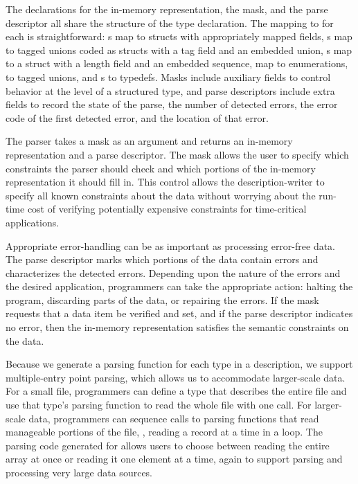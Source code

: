 The \C{} declarations for the in-memory representation, the mask, 
and the parse descriptor all share the structure of the \pads{}
type declaration.  The mapping to \C{} for each is straightforward: 
s map to \C{} structs with appropriately mapped fields, 
s map to tagged unions coded as \C{} structs with a tag field 
and an embedded 
union, s map to a \C{} struct with a length field and an 
embedded sequence,  map to \C{} enumerations,  
to tagged unions, and s to \C{} typedefs.  Masks include
auxiliary fields to control behavior at the level of a structured
type, and parse descriptors include extra fields to record the 
state of the parse, the number of detected errors, 
the error code of the first detected error, and the location of that error.

The parser takes a mask as an argument and returns an
in-memory representation and a parse descriptor.  
The mask allows the user to specify 
which constraints the parser should check and which portions of the
in-memory representation it should fill in.  This control allows the
description-writer to specify all known constraints about the data
without worrying about the run-time cost of verifying potentially
expensive constraints for time-critical applications.

Appropriate error-handling can be as important as processing
error-free data.  The parse descriptor marks which portions of the
data contain errors and characterizes the detected errors.
Depending upon the nature of the errors and the desired application,
programmers can take the appropriate action: halting the program,
discarding parts of the data, or repairing the errors.
If the mask requests
that a data item be verified and set, and if the parse descriptor
indicates no error, then the in-memory representation satisfies the
semantic constraints on the data.

Because we generate a parsing function for each type in a \pads{} description,
we support multiple-entry point parsing, which allows us to 
accommodate larger-scale data.
For a small file, programmers can define a \pads{} type that describes
the entire file and use that type's parsing function to read the whole
file with one call.  For larger-scale data, programmers can sequence
calls to parsing functions that read manageable portions of the file,
\eg{}, reading a record at a time in a loop.  The parsing code generated
for  allows users to choose between reading the entire array
at once or reading it one element at a time, again to support parsing
and processing very large data sources.

